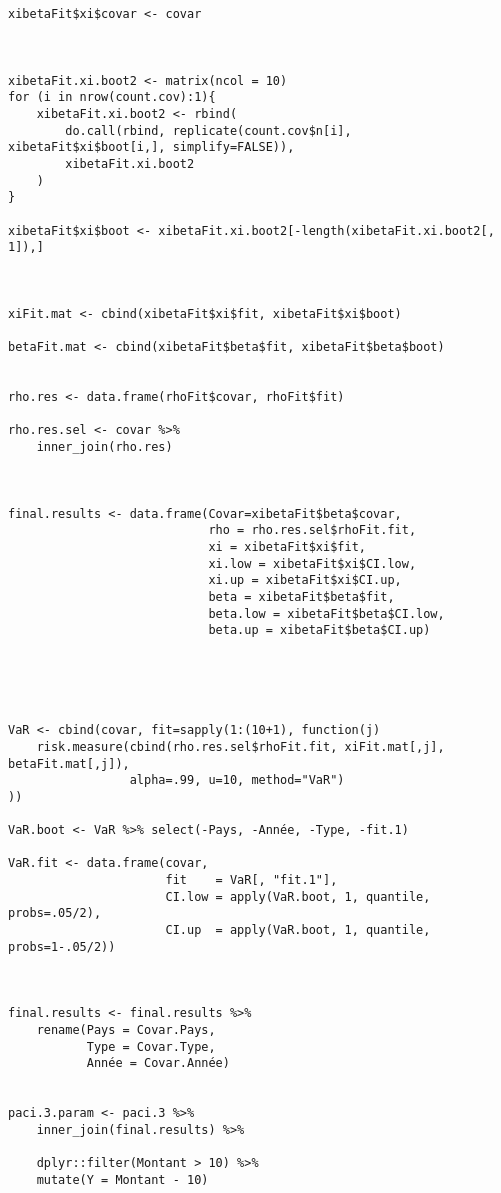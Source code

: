 \begin{lstlisting}
xibetaFit$xi$covar <- covar



xibetaFit.xi.boot2 <- matrix(ncol = 10)
for (i in nrow(count.cov):1){
    xibetaFit.xi.boot2 <- rbind(
        do.call(rbind, replicate(count.cov$n[i], xibetaFit$xi$boot[i,], simplify=FALSE)),
        xibetaFit.xi.boot2
    )
}

xibetaFit$xi$boot <- xibetaFit.xi.boot2[-length(xibetaFit.xi.boot2[, 1]),]



xiFit.mat <- cbind(xibetaFit$xi$fit, xibetaFit$xi$boot)

betaFit.mat <- cbind(xibetaFit$beta$fit, xibetaFit$beta$boot)


rho.res <- data.frame(rhoFit$covar, rhoFit$fit)

rho.res.sel <- covar %>% 
    inner_join(rho.res)



final.results <- data.frame(Covar=xibetaFit$beta$covar,
                            rho = rho.res.sel$rhoFit.fit,
                            xi = xibetaFit$xi$fit,
                            xi.low = xibetaFit$xi$CI.low,
                            xi.up = xibetaFit$xi$CI.up,
                            beta = xibetaFit$beta$fit,
                            beta.low = xibetaFit$beta$CI.low,
                            beta.up = xibetaFit$beta$CI.up)





VaR <- cbind(covar, fit=sapply(1:(10+1), function(j)
    risk.measure(cbind(rho.res.sel$rhoFit.fit, xiFit.mat[,j], betaFit.mat[,j]),
                 alpha=.99, u=10, method="VaR")
))

VaR.boot <- VaR %>% select(-Pays, -Année, -Type, -fit.1)

VaR.fit <- data.frame(covar, 
                      fit    = VaR[, "fit.1"], 
                      CI.low = apply(VaR.boot, 1, quantile, probs=.05/2),
                      CI.up  = apply(VaR.boot, 1, quantile, probs=1-.05/2))



final.results <- final.results %>% 
    rename(Pays = Covar.Pays,
           Type = Covar.Type,
           Année = Covar.Année) 


paci.3.param <- paci.3 %>% 
    inner_join(final.results) %>% 
    
    dplyr::filter(Montant > 10) %>% 
    mutate(Y = Montant - 10)




\end{lstlisting}
